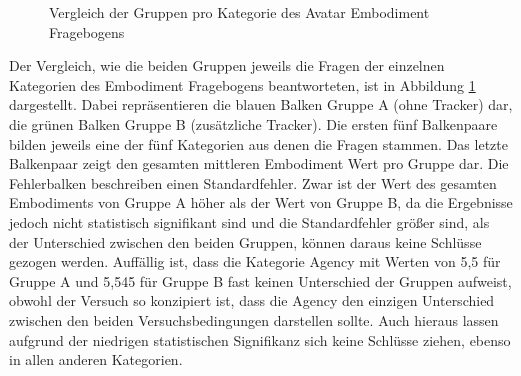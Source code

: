 \begin{figure}[h]
  \caption[Avatar Embodiment Durchschnitte pro Kategorie]{Vergleich der Gruppen pro Kategorie des Avatar Embodiment Fragebogens}
  \label{fig:TotalEmbodiment-Kategorien}
\end{figure}

Der Vergleich, wie die beiden Gruppen jeweils die Fragen der einzelnen Kategorien des Embodiment Fragebogens beantworteten, ist in Abbildung \ref{fig:TotalEmbodiment-Kategorien} dargestellt. Dabei repräsentieren die blauen Balken Gruppe A (ohne Tracker) dar, die grünen Balken Gruppe B (zusätzliche Tracker). Die ersten fünf Balkenpaare bilden jeweils eine der fünf Kategorien aus denen die Fragen stammen. Das letzte Balkenpaar zeigt den gesamten mittleren Embodiment Wert pro Gruppe dar. Die Fehlerbalken beschreiben einen Standardfehler.
Zwar ist der Wert des gesamten Embodiments von Gruppe A höher als der Wert von Gruppe B, da die Ergebnisse jedoch nicht statistisch signifikant sind und die Standardfehler größer sind, als der Unterschied zwischen den beiden Gruppen, können daraus keine Schlüsse gezogen werden. Auffällig ist, dass die Kategorie Agency mit Werten von 5,5 für Gruppe A und 5,545 für Gruppe B fast keinen Unterschied der Gruppen  aufweist, obwohl der Versuch so konzipiert ist, dass die Agency den einzigen Unterschied zwischen den beiden Versuchsbedingungen darstellen sollte. Auch hieraus lassen aufgrund der niedrigen statistischen Signifikanz sich keine Schlüsse ziehen, ebenso in allen anderen Kategorien.

